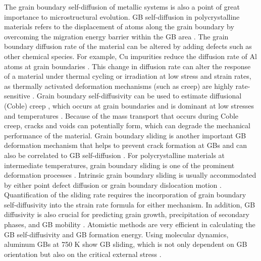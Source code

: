 \documentclass[review]{elsarticle}
\begin{document}
\par The grain boundary self-diffusion of metallic systems is also a point of great importance to microstructural evolution. GB self-diffusion in polycrystalline materials refers to the displacement of atoms along the grain boundary by overcoming the migration energy barrier within the GB area \cite{lipnitskii2011}. The grain boundary diffusion rate of the material can be altered by adding defects such as other chemical species. For example, Cu impurities reduce the diffusion rate of Al atoms at grain boundaries \cite{balluffi1996}. This change in diffusion rate can alter the response of a material under thermal cycling or irradiation at low stress and strain rates, as thermally activated deformation mechanisms (such as creep) are highly rate-sensitive \cite{calhoun}. Grain boundary self-diffusivity can be used to estimate diffusional (Coble) creep \cite{MCFADDEN202066_creep}, which occurs at grain boundaries and is dominant at low stresses and temperatures \cite{Nabarro,coble,1970_langdon}. Because of the mass transport that occurs during Coble creep, cracks and voids can potentially form, which can degrade the mechanical performance of the material. Grain boundary sliding is another important GB deformation mechanism that helps to prevent crack formation at GBs and can also be correlated to GB self-diffusion \cite{MISHIN_gb_diff}. For polycrystalline materials at intermediate temperatures, grain boundary sliding is one of the prominent deformation processes \cite{GB_deformation}. Intrinsic grain boundary sliding is usually accommodated by either point defect diffusion \cite{GB_deformation} or grain boundary dislocation motion \cite{GATES197455}. Quantification of the sliding rate requires the incorporation of grain boundary self-diffusivity into the strain rate formula for either mechanism. In addition, GB diffusivity is also crucial for predicting grain growth, precipitation of secondary phases, and GB mobility \cite{MISHIN_gb_diff, GB_deformation}. Atomistic methods are very efficient in calculating the GB self-diffusivity and GB formation energy\cite{calhoun}. Using molecular dynamics, aluminum GBs at 750 K show GB sliding, which is not only dependent on GB orientation but also on the critical external stress \cite{MD_GBS}. 
\end{document}
